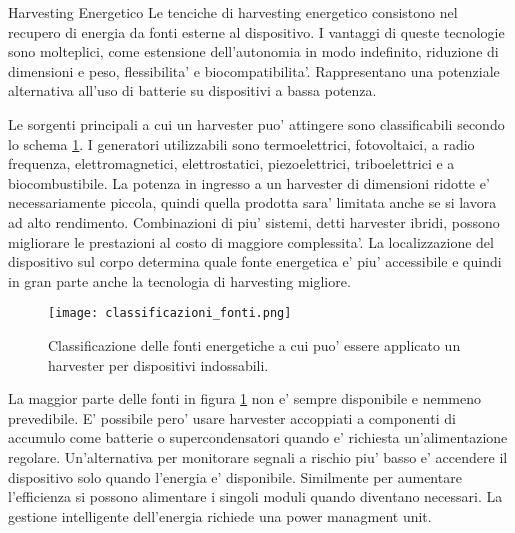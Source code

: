 \begin{section}{Harvesting Energetico}
    Le tenciche di harvesting energetico consistono nel recupero di energia da fonti esterne al dispositivo. I vantaggi di queste tecnologie sono molteplici, come estensione dell'autonomia in modo indefinito, riduzione di dimensioni e peso, flessibilita' e biocompatibilita'. Rappresentano una potenziale alternativa all'uso di batterie su dispositivi a bassa potenza.

    Le sorgenti principali a cui un harvester puo' attingere sono classificabili secondo lo schema  \ref{fig:classificazione}. I generatori utilizzabili sono termoelettrici, fotovoltaici, a radio frequenza, elettromagnetici, elettrostatici, piezoelettrici, triboelettrici e a biocombustibile. La potenza in ingresso a un harvester di dimensioni ridotte e' necessariamente piccola, quindi quella prodotta sara' limitata anche se si lavora ad alto rendimento. Combinazioni di piu' sistemi, detti harvester ibridi, possono migliorare le prestazioni al costo di maggiore complessita'. La localizzazione del dispositivo sul corpo determina quale fonte energetica e' piu' accessibile e quindi in gran parte anche la tecnologia di harvesting migliore.
    \begin{figure}[H]
        \texttt{[image: classificazioni\_fonti.png]}
        \centering
        \caption{Classificazione delle fonti energetiche a cui puo' essere applicato un harvester per dispositivi indossabili.}
        \label{fig:classificazione}
    \end{figure}
    
    La maggior parte delle fonti in figura \ref{fig:classificazione} non e' sempre disponibile e nemmeno prevedibile. E' possibile pero' usare harvester accoppiati a componenti di accumulo come batterie o supercondensatori quando e' richiesta un'alimentazione regolare. Un'alternativa per monitorare segnali a rischio piu' basso e' accendere il dispositivo solo quando l'energia e' disponibile. Similmente per aumentare l'efficienza si possono alimentare i singoli moduli quando diventano necessari. La gestione intelligente dell'energia richiede una power managment unit.
\end{section}

